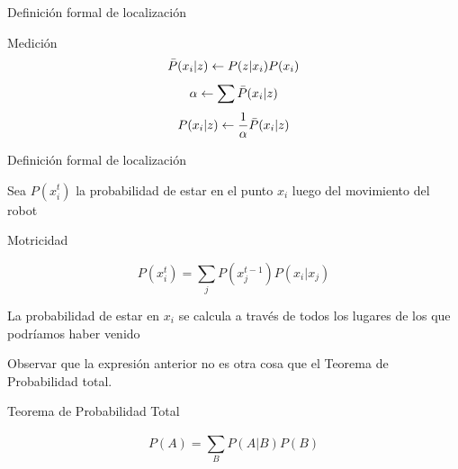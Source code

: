 \begin{frame}{Definición formal de localización}
    
    \begin{block}{Medición}
        \begin{displaymath}
            \Bar{P}(x_{i}|z) \leftarrow P(z|x_{i}) P(x_{i})
        \end{displaymath}
        \begin{displaymath}
            \alpha \leftarrow \sum \Bar{P}(x_{i}|z)
        \end{displaymath}
        \begin{displaymath}
            P(x_{i}|z) \leftarrow \frac{1}{\alpha} \Bar{P}(x_{i}|z)
        \end{displaymath}
        
    \end{block}
    
\end{frame}

\begin{frame}{Definición formal de localización}
    
    Sea $P(x_{i}^{t})$ la probabilidad de estar en el punto $x_{i}$ luego del movimiento del robot
    
    \begin{block}{Motricidad}
        
        \begin{displaymath}
            P(x_{i}^{t}) = \sum_{j} P(x_{j}^{t-1}) P(x_{i}|x_{j})
        \end{displaymath}
        
    \end{block}
    
    La probabilidad de estar en $x_{i}$ se calcula a través de todos los lugares de los que podríamos haber venido
    
    Observar que la expresión anterior no es otra cosa que el Teorema de Probabilidad total.
    
    \begin{block}{Teorema de Probabilidad Total}
        
        \begin{displaymath}
            P(A) = \sum_{B}^{}P(A|B) P(B)
        \end{displaymath}
        
    \end{block}
    
\end{frame}


